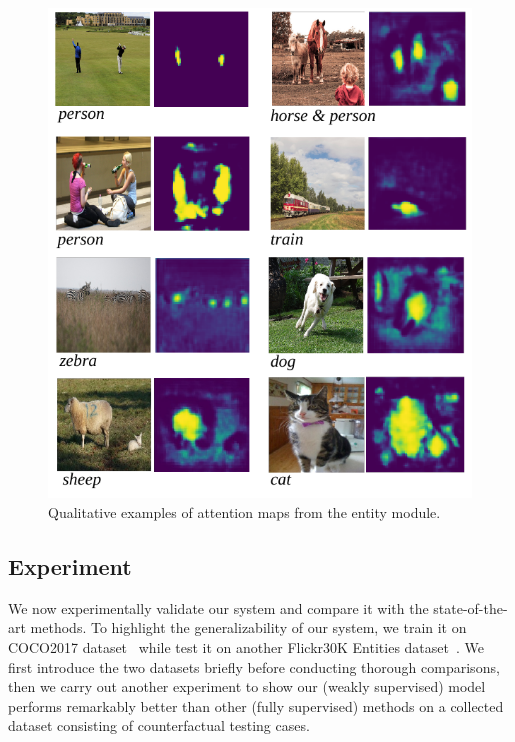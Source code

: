 \begin{figure}[h]
\begin{center}
\includegraphics[width=.95\linewidth]{images/entity_demo.pdf}
\end{center}
\vspace{-7mm}
\caption{Qualitative examples of attention maps from the entity module.  }
\vspace{-5mm}
\label{fig:entity_demo}
\end{figure}


\subsection{Experiment}
We now experimentally validate our system and compare it with the state-of-the-art methods.
To highlight the generalizability of our system,
we train it on COCO2017 dataset~\citep{lin2014microsoft}
while test it on another Flickr30K Entities dataset~\citep{plummer2015flickr30k}.
We first introduce the two datasets briefly before conducting thorough comparisons,
then we carry out another experiment to show our (weakly supervised) model performs remarkably better than other (fully supervised) methods on a collected dataset consisting of counterfactual testing cases.


